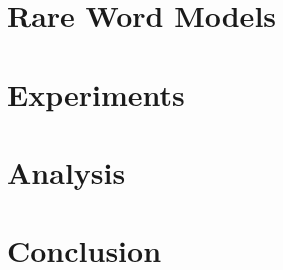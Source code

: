  

\section{Rare Word Models}
\label{sec:rare}


\section{Experiments}
\label{sec:exp}


\section{Analysis}
\label{sec:analysis}


\section{Conclusion}
\label{sec:conclude}



